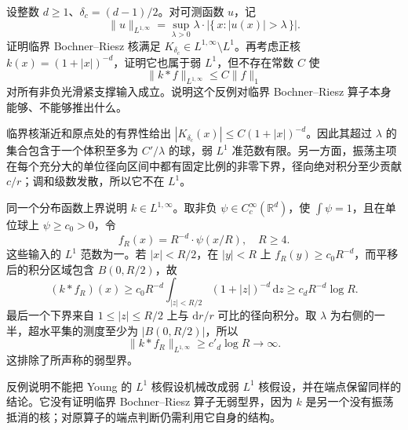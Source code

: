 \begin{exercise}\label{b2:ex:24-new-4}
设整数 \(d\geq1\)、\(\delta_c=(d-1)/2\)。对可测函数 \(u\)，记
\[
 \|u\|_{L^{1,\infty}}
 =\sup_{\lambda>0}\lambda\cdot
       |\{\,x:|u(x)|>\lambda\,\}|.
\]
证明临界 Bochner--Riesz 核满足
\(K_{\delta_c}\in L^{1,\infty}\setminus L^1\)。再考虑正核
\(k(x)=(1+|x|)^{-d}\)，证明它也属于弱 \(L^1\)，但不存在常数 \(C\) 使
\[
 \|k*f\|_{L^{1,\infty}}\leq C\|f\|_1
\]
对所有非负光滑紧支撑输入成立。说明这个反例对临界 Bochner--Riesz 算子本身能够、不能够推出什么。
\end{exercise}
\begin{solution}
临界核渐近和原点处的有界性给出
\(|K_{\delta_c}(x)|\leq C(1+|x|)^{-d}\)。因此其超过 \(\lambda\) 的集合包含于一个体积至多为 \(C'/\lambda\) 的球，弱 \(L^1\) 准范数有限。另一方面，振荡主项在每个充分大的单位径向区间中都有固定比例的非零下界，径向绝对积分至少贡献 \(c/r\)；调和级数发散，所以它不在 \(L^1\)。

同一个分布函数上界说明 \(k\in L^{1,\infty}\)。取非负 \(\psi\in C_c^\infty(\mathbb R^d)\)，使 \(\int\psi=1\)，且在单位球上 \(\psi\geq c_0>0\)，令
\[
 f_R(x)=R^{-d}\cdot\psi(x/R),\quad R\geq4.
\]
这些输入的 \(L^1\) 范数为一。若 \(|x|<R/2\)，在 \(|y|<R\) 上 \(f_R(y)\geq c_0R^{-d}\)，而平移后的积分区域包含 \(B(0,R/2)\)，故
\[
 (k*f_R)(x)
 \geq c_0R^{-d}\int_{|z|<R/2}(1+|z|)^{-d}\,\mathrm dz
 \geq c_dR^{-d}\log R.
\]
最后一个下界来自 \(1\leq|z|\leq R/2\) 上与 \(\mathrm dr/r\) 可比的径向积分。取 \(\lambda\) 为右侧的一半，超水平集的测度至少为 \(|B(0,R/2)|\)，所以
\[
 \|k*f_R\|_{L^{1,\infty}}\geq c'_d\log R\longrightarrow\infty.
\]
这排除了所声称的弱型界。

反例说明不能把 Young 的 \(L^1\) 核假设机械改成弱 \(L^1\) 核假设，并在端点保留同样的结论。它没有证明临界 Bochner--Riesz 算子无弱型界，因为 \(k\) 是另一个没有振荡抵消的核；对原算子的端点判断仍需利用它自身的结构。
\end{solution}

